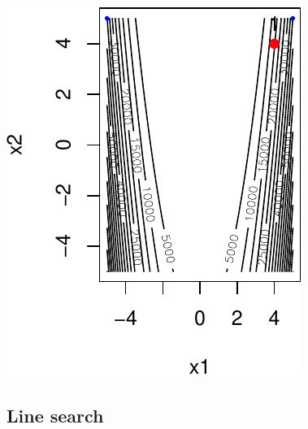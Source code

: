 \documentclass[12pt]{beamer}
\begin{document}
\begin{frame}
\begin{center}
\begin{minipage}[b]{0.3\textwidth}
\includegraphics[width=\textwidth]{gradient_rosen_alpha0.1_x_diverges-crop.pdf} 
\end{minipage}
\end{center}
\end{frame}

\subsection{Line search}
\end{document}
